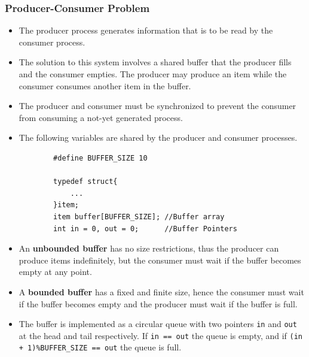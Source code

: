 \documentclass{article}
\theoremstyle{plain}
\theoremstyle{definition}
\begin{document}
\subsubsection{Producer-Consumer Problem}
\begin{itemize}
    \item The producer process generates information that is to be read by the consumer process.
    
    \item The solution to this system involves a shared buffer that the producer fills and the consumer empties. The producer may produce an item while the consumer consumes another item in the buffer.
    
    \item The producer and consumer must be synchronized to prevent the consumer from consuming a not-yet generated process. 
    
    \item The following variables are shared by the producer and consumer processes.
    
    \begin{verbatim}
        #define BUFFER_SIZE 10
        
        typedef struct{
            ...
        }item;
        item buffer[BUFFER_SIZE]; //Buffer array
        int in = 0, out = 0;      //Buffer Pointers
    \end{verbatim}
    
    \item An \textbf{unbounded buffer} has no size restrictions, thus the producer can produce items indefinitely, but the consumer must wait if the buffer becomes empty at any point.
    
    \item A \textbf{bounded buffer} has a fixed and finite size, hence the consumer must wait if the buffer becomes empty and the producer must wait if the buffer is full. 
    
    \item The buffer is implemented as a circular queue with two pointers \texttt{in} and \texttt{out} at the head and tail respectively. If \texttt{in == out} the queue is empty, and if \texttt{(in + 1)\%BUFFER\_SIZE == out} the queue is full.
\end{itemize}
\end{document}
